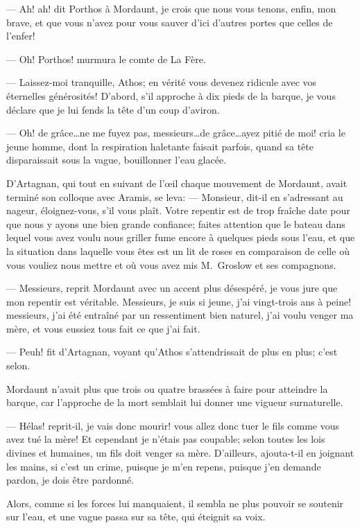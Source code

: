 — Ah! ah! dit Porthos à Mordaunt, je crois que nous vous tenons, enfin, mon brave, et que vous n'avez pour vous sauver d'ici d'autres portes que celles de l'enfer!

— Oh! Porthos! murmura le comte de La Fère.

— Laissez-moi tranquille, Athos; en vérité vous devenez ridicule avec vos éternelles générosités! D'abord, s'il approche à dix pieds de la barque, je vous déclare que je lui fends la tête d'un coup d'aviron.

— Oh! de grâce\dots ne me fuyez pas, messieurs\dots de grâce\dots ayez pitié de moi! cria le jeune homme, dont la respiration haletante faisait parfois, quand sa tête disparaissait sous la vague, bouillonner l'eau glacée.

D'Artagnan, qui tout en suivant de l'œil chaque mouvement de Mordaunt, avait terminé son colloque avec Aramis, se leva:
— Monsieur, dit-il en s'adressant au nageur, éloignez-vous, s'il vous plaît. Votre repentir est de trop fraîche date pour que nous y ayons une bien grande confiance; faites attention que le bateau dans lequel vous avez voulu nous griller fume encore à quelques pieds sous l'eau, et que la situation dans laquelle vous êtes est un lit de roses en comparaison de celle où vous vouliez nous mettre et où vous avez mis M.~Groslow et ses compagnons.

— Messieurs, reprit Mordaunt avec un accent plus désespéré, je vous jure que mon repentir est véritable. Messieurs, je suis si jeune, j'ai vingt-trois ans à peine! messieurs, j'ai été entraîné par un ressentiment bien naturel, j'ai voulu venger ma mère, et vous eussiez tous fait ce que j'ai fait.

— Peuh! fit d'Artagnan, voyant qu'Athos s'attendrissait de plus en plus; c'est selon.

Mordaunt n'avait plus que trois ou quatre brassées à faire pour atteindre la barque, car l'approche de la mort semblait lui donner une vigueur surnaturelle.

— Hélas! reprit-il, je vais donc mourir! vous allez donc tuer le fils comme vous avez tué la mère! Et cependant je n'étais pas coupable; selon toutes les lois divines et humaines, un fils doit venger sa mère. D'ailleurs, ajouta-t-il en joignant les mains, si c'est un crime, puisque je m'en repens, puisque j'en demande pardon, je dois être pardonné.

Alors, comme si les forces lui manquaient, il sembla ne plus pouvoir se soutenir sur l'eau, et une vague passa sur sa tête, qui éteignit sa voix.

